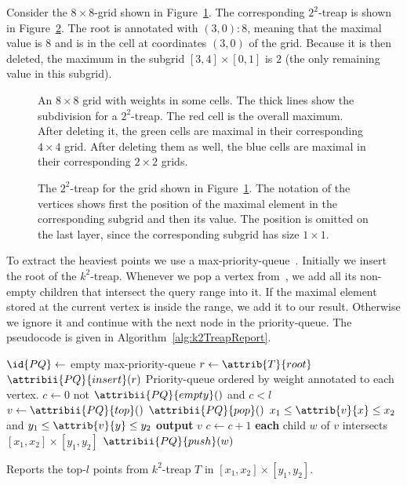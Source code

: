 \begin{Example}
  Consider the $8 \times 8$-grid shown in Figure~\ref{fig:k2TreapGrid}. The corresponding $2^2$-treap is shown in Figure~\ref{fig:k2Treap}. The root is annotated with $(3, 0) : 8$, meaning that the maximal value is $8$ and is in the cell at coordinates $(3, 0)$ of the grid. Because it is then deleted, the maximum in the subgrid $[3, 4] \times [0, 1]$ is $2$ (the only remaining value in this subgrid).

  \begin{figure}[htb]
    \centering
    
    \caption{An $8 \times 8$ grid with weights in some cells. The thick lines show the subdivision for a $2^2$-treap. The red cell is the overall maximum. After deleting it, the green cells are maximal in their corresponding $4 \times 4$ grid. After deleting them as well, the blue cells are maximal in their corresponding $2 \times 2$ grids.}
    \label{fig:k2TreapGrid}
  \end{figure}


  \begin{figure}[htb]
    \centering
    
    \caption{The $2^2$-treap for the grid shown in Figure~\ref{fig:k2TreapGrid}. The notation of the vertices shows first the position of the maximal element in the corresponding subgrid and then its value. The position is omitted on the last layer, since the corresponding subgrid has size $1 \times 1$.}
    \label{fig:k2Treap}
  \end{figure}
\end{Example}

To extract the heaviest points we use a max-priority-queue~. Initially we insert the root of the $k^2$-treap. Whenever we pop a vertex from~, we add all its non-empty children that intersect the query range into it. If the maximal element stored at the current vertex is inside the range, we add it to our result. Otherwise we ignore it and continue with the next node in the priority-queue. The pseudocode is given in Algorithm~\ref{alg:k2TreapReport}.

\begin{algorithm}[htb]
  \begin{codebox}
    \li $\id{PQ} \gets$ empty max-priority-queue
    \li $r \gets \attrib{T}{root}$
    \li $\attribii{PQ}{insert}(r)$ \>\>\>\>\Comment Priority-queue ordered by weight annotated to each vertex.
    \li $c \gets 0$
    \li \While not $\attribii{PQ}{empty}()$ and $c < l$
        \Do
    \li   $v \gets \attribii{PQ}{top}()$
    \li   $\attribii{PQ}{pop}()$
    \li   \If $x_1 \leq \attrib{v}{x} \leq x_2$ and $y_1 \leq \attrib{v}{y} \leq y_2$
          \Then
    \li     \textbf{output} $v$
    \li     $c \gets c + 1$
          \End
    \li   \For \textbf{each} child $w$ of $v$
          \Do
    \li     \If {} intersects $[x_1, x_2] \times [y_1, y_2]$
            \Then
    \li       $\attribii{PQ}{push}(w)$
            \End
          \End
        \End
  \end{codebox}
  \caption{Reports the top-$l$ points from $k^2$-treap $T$ in $[x_1, x_2] \times [y_1, y_2]$.}
  \label{alg:k2TreapReport}
\end{algorithm}
